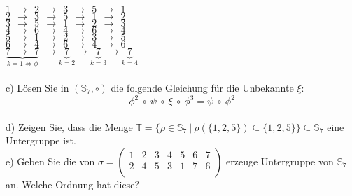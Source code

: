 $1 \ \ \rightarrow \ \ 2 \ \ \rightarrow \ \ 3 \ \ \rightarrow \ \ 5 \ \ \rightarrow \ \ 1$\\
$2 \ \ \rightarrow \ \ 3 \ \ \rightarrow \ \ 5 \ \ \rightarrow \ \ 1 \ \ \rightarrow \ \ 2$\\
$3 \ \ \rightarrow \ \ 5 \ \ \rightarrow \ \ 1 \ \ \rightarrow \ \ 2 \ \ \rightarrow \ \ 3$\\
$4 \ \ \rightarrow \ \ 6 \ \ \rightarrow \ \ 4 \ \ \rightarrow \ \ 6 \ \ \rightarrow \ \ 4$\\
$5 \ \ \rightarrow \ \ 1 \ \ \rightarrow \ \ 2 \ \ \rightarrow \ \ 3 \ \ \rightarrow \ \ 5$\\
$6 \ \ \rightarrow \ \ 4 \ \ \rightarrow \ \ 6 \ \ \rightarrow \ \ 4 \ \ \rightarrow \ \ 6$\\
$\underbrace{7 \ \ \rightarrow \ \ 7}_{k = 1 \Leftrightarrow \phi} \ \ \rightarrow \underbrace{7}_{k = 2} \rightarrow \underbrace{7}_{k = 3} \rightarrow \underbrace{7}_{k = 4}$\\~\\

c) Lösen Sie in $(\mathbb{S}_7, \circ)$ die folgende Gleichung für die Unbekannte $\xi:$
$$
\phi^2 \ \circ \ \psi \ \circ \ \xi \ \circ \ \phi^3 = \psi \ \circ \ \phi^2
$$\\

d) Zeigen Sie, dass die Menge $\mathbb{T} = \{\rho \in \mathbb{S}_7 \ | \ \rho(\{1, 2, 5\}) \subseteq \{1, 2, 5\}\} \subseteq \mathbb{S}_7$ eine Untergruppe ist.\\

e) Geben Sie die von $\sigma = \begin{pmatrix}1 & 2 & 3 & 4 & 5 & 6 & 7\\2 & 4 & 5 & 3 & 1 & 7 & 6\\\end{pmatrix}$ erzeuge Untergruppe von $\mathbb{S}_7$ an. Welche Ordnung hat diese?

\newpage



